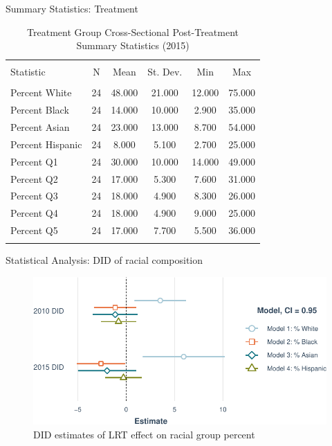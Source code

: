 \documentclass[11pt,ignorenonframetext,]{beamer}
\begin{document}
\begin{frame}{Summary Statistics: Treatment}
\protect\hypertarget{summary-statistics-treatment-1}{}

\begin{table}[!htbp] \centering 
  \caption{Treatment Group Cross-Sectional Post-Treatment Summary Statistics (2015)} 
  \label{} 
\begin{tabular}{@{\extracolsep{5pt}}lccccc} 
\\[-1.8ex]\hline \\[-1.8ex] 
Statistic & \multicolumn{1}{c}{N} & \multicolumn{1}{c}{Mean} & \multicolumn{1}{c}{St. Dev.} & \multicolumn{1}{c}{Min} & \multicolumn{1}{c}{Max} \\ 
\hline \\[-1.8ex] 
Percent White & 24 & 48.000 & 21.000 & 12.000 & 75.000 \\ 
Percent Black & 24 & 14.000 & 10.000 & 2.900 & 35.000 \\ 
Percent Asian & 24 & 23.000 & 13.000 & 8.700 & 54.000 \\ 
Percent Hispanic & 24 & 8.000 & 5.100 & 2.700 & 25.000 \\ 
Percent Q1 & 24 & 30.000 & 10.000 & 14.000 & 49.000 \\ 
Percent Q2 & 24 & 17.000 & 5.300 & 7.600 & 31.000 \\ 
Percent Q3 & 24 & 18.000 & 4.900 & 8.300 & 26.000 \\ 
Percent Q4 & 24 & 18.000 & 4.900 & 9.000 & 25.000 \\ 
Percent Q5 & 24 & 17.000 & 7.700 & 5.500 & 36.000 \\ 
\hline \\[-1.8ex] 
\end{tabular} 
\end{table}

\end{frame}

\begin{frame}{Statistical Analysis: DID of racial composition}
\protect\hypertarget{statistical-analysis-did-of-racial-composition}{}

\begin{figure}
\centering
\includegraphics{csde_talk_files/figure-beamer/unnamed-chunk-12-1.pdf}
\caption{DID estimates of LRT effect on racial group percent}
\end{figure}

\end{frame}
\end{document}
